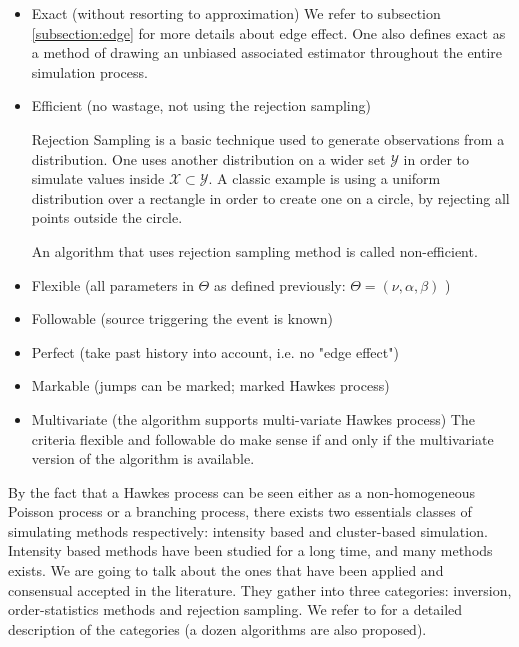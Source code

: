 \begin{itemize}
\setlength{\itemindent}{2 cm}
\item Exact (without resorting to approximation)
We refer to subsection \ref{subsection:edge} for more details about edge effect. One also defines exact as a method of drawing an unbiased associated estimator throughout the entire simulation process. 
\item Efficient (no wastage, not using the rejection sampling)

\begin{definition}
Rejection Sampling is a basic technique used to generate observations from a distribution. One uses another distribution on a wider set $\mathcal Y$ in order to simulate values inside $\mathcal X \subset \mathcal Y$. A classic example is using a uniform distribution over a rectangle in order to create one on a circle, by rejecting all points outside the circle. 
\end{definition}

An algorithm that uses rejection sampling method is called non-efficient. 

\item Flexible (all parameters in $\Theta$ as defined previously: $ \Theta = ( \nu, \alpha, \beta ) $ )
\item Followable (source triggering the event is known)
\item Perfect (take past history into account, i.e. no "edge effect")
\item Markable (jumps can be marked; marked Hawkes process)
\item Multivariate (the algorithm supports multi-variate Hawkes process)
The criteria flexible and followable do make sense if and only if the multivariate version of the algorithm is available.

\end{itemize}


By the fact that a Hawkes process can be seen either as a non-homogeneous Poisson process or a branching process, there exists two essentials classes of simulating methods respectively: intensity based and cluster-based simulation. Intensity based methods have been studied for a long time, and many methods exists. We are going to talk about the ones that have been applied and consensual accepted in the literature. They gather into three categories: inversion, order-statistics methods and rejection sampling. We refer to \cite{gen_nonhomo_poisson} for a detailed description of the categories (a dozen algorithms are also proposed).



